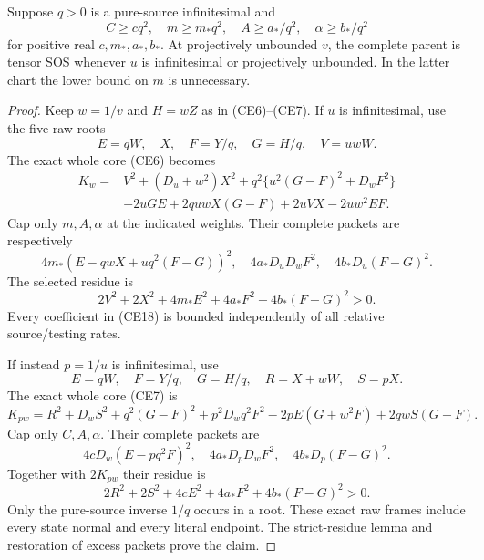 \begin{lemma}
Suppose $q>0$ is a pure-source infinitesimal and
\[
 C\ge c q^2,\quad m\ge m_*q^2,\quad
 A\ge a_*/q^2,\quad\alpha\ge b_*/q^2
                                                        \tag{CE17}
\]
for positive real $c,m_*,a_*,b_*$. At projectively unbounded $v$,
the complete parent is tensor SOS whenever $u$ is infinitesimal or
projectively unbounded. In the latter chart the lower bound on $m$
is unnecessary.
\end{lemma}
\begin{proof}
Keep $w=1/v$ and $H=wZ$ as in (CE6)--(CE7). If $u$ is infinitesimal,
use the five raw roots
\[
 E=qW,\quad X,\quad F=Y/q,\quad G=H/q,\quad V=uwW.
\]
The exact whole core (CE6) becomes
\begin{align*}
 K_w={}&V^2+(D_u+w^2)X^2
       +q^2\{u^2(G-F)^2+D_wF^2\}\\
 &-2uGE+2quwX(G-F)+2uVX-2uw^2EF.             \tag{CE18}
\end{align*}
Cap only $m,A,\alpha$ at the indicated weights. Their complete packets
are respectively
\[
 4m_*(E-qwX+uq^2(F-G))^2,\quad
 4a_*D_uD_wF^2,\quad4b_*D_u(F-G)^2.
\]
The selected residue is
\[
 2V^2+2X^2+4m_*E^2+4a_*F^2+4b_*(F-G)^2>0.   \tag{CE19}
\]
Every coefficient in (CE18) is bounded independently of all relative
source/testing rates.

If instead $p=1/u$ is infinitesimal, use
\[
 E=qW,\quad F=Y/q,\quad G=H/q,\quad
 R=X+wW,\quad S=pX.
\]
The exact whole core (CE7) is
\[
 K_{pw}=R^2+D_wS^2+q^2(G-F)^2+p^2D_wq^2F^2
       -2pE(G+w^2F)+2qwS(G-F).               \tag{CE20}
\]
Cap only $C,A,\alpha$. Their complete packets are
\[
 4cD_w(E-pq^2F)^2,\quad4a_*D_pD_wF^2,
 \quad4b_*D_p(F-G)^2.
\]
Together with $2K_{pw}$ their residue is
\[
 2R^2+2S^2+4cE^2+4a_*F^2+4b_*(F-G)^2>0.     \tag{CE21}
\]
Only the pure-source inverse $1/q$ occurs in a root. These exact raw
frames include every state normal and every literal endpoint. The
strict-residue lemma and restoration of excess packets prove the claim.
\end{proof}

